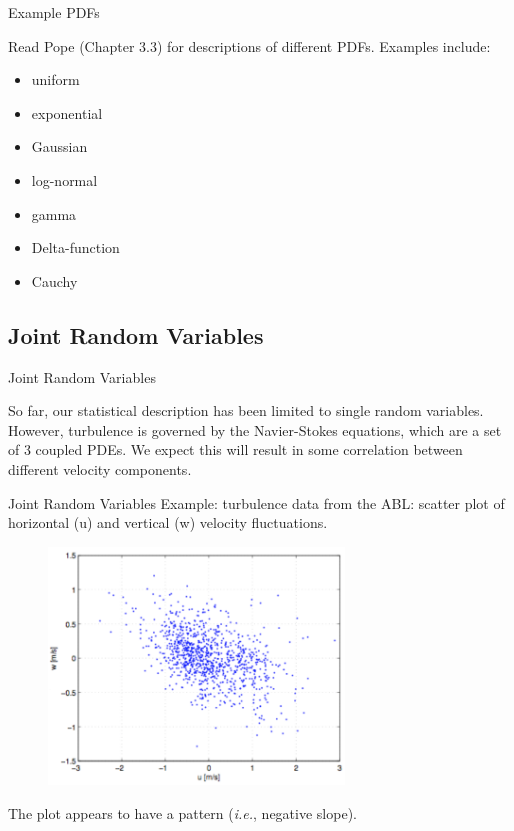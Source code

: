 
\begin{frame}{Example PDFs}

Read Pope (Chapter 3.3) for descriptions of different PDFs. \newline\newline Examples include:
\begin{itemize}
	\item uniform
	\item exponential
	\item Gaussian
	\item log-normal
	\item gamma
	\item Delta-function
	\item Cauchy
\end{itemize}

\end{frame}

\subsection{Joint Random Variables}
\begin{frame}{Joint Random Variables}

So far, our statistical description has been limited to single random variables. However, turbulence is governed by the Navier-Stokes equations, which are a set of 3 coupled PDEs.\newline\newline
We expect this will result in some correlation between different velocity components.

\end{frame}


\begin{frame}{Joint Random Variables}
  Example: turbulence data from the ABL: scatter plot of horizontal (u) and vertical (w) velocity fluctuations.
  \begin{figure}[H]
  \centering
  \includegraphics[width=0.7\textwidth]{jr1.png}
  \end{figure}
  The plot appears to have a pattern (\textit{i.e.}, negative slope).
\end{frame}

